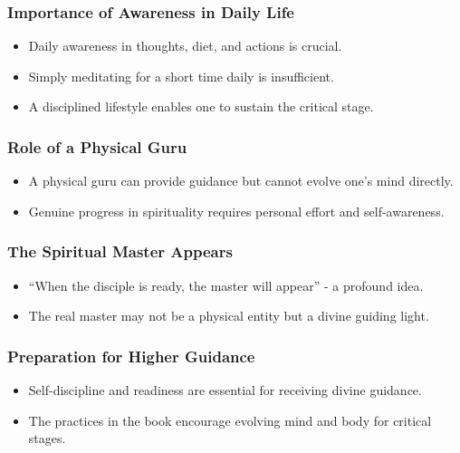 \begin{frame}[fragile]\frametitle{Importance of Awareness in Daily Life}
    \begin{itemize}
        \item Daily awareness in thoughts, diet, and actions is crucial.
        \item Simply meditating for a short time daily is insufficient.
        \item A disciplined lifestyle enables one to sustain the critical stage.
    \end{itemize}
\end{frame}

\begin{frame}[fragile]\frametitle{Role of a Physical Guru}
    \begin{itemize}
        \item A physical guru can provide guidance but cannot evolve one’s mind directly.
        \item Genuine progress in spirituality requires personal effort and self-awareness.
    \end{itemize}
\end{frame}

\begin{frame}[fragile]\frametitle{The Spiritual Master Appears}
    \begin{itemize}
        \item ``When the disciple is ready, the master will appear'' - a profound idea.
        \item The real master may not be a physical entity but a divine guiding light.
    \end{itemize}
\end{frame}

\begin{frame}[fragile]\frametitle{Preparation for Higher Guidance}
    \begin{itemize}
        \item Self-discipline and readiness are essential for receiving divine guidance.
        \item The practices in the book encourage evolving mind and body for critical stages.
    \end{itemize}
\end{frame}

